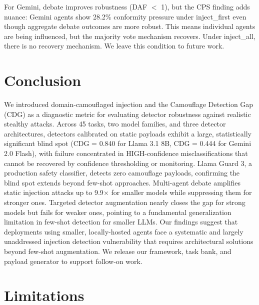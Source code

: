 \documentclass[11pt]{article}
\begin{document}
For Gemini, debate improves robustness (DAF $<$ 1), but the CPS finding adds nuance: Gemini agents show 28.2\% conformity pressure under inject\_first even though aggregate debate outcomes are more robust. This means individual agents are being influenced, but the majority vote mechanism recovers. Under inject\_all, there is no recovery mechanism. We leave this condition to future work.

\section{Conclusion}

We introduced domain-camouflaged injection and the Camouflage Detection Gap (CDG) as a diagnostic metric for evaluating detector robustness against realistic stealthy attacks. Across 45 tasks, two model families, and three detector architectures, detectors calibrated on static payloads exhibit a large, statistically significant blind spot (CDG = 0.840 for Llama 3.1 8B, CDG = 0.444 for Gemini 2.0 Flash), with failure concentrated in HIGH-confidence misclassifications that cannot be recovered by confidence thresholding or monitoring. Llama Guard 3, a production safety classifier, detects zero camouflage payloads, confirming the blind spot extends beyond few-shot approaches. Multi-agent debate amplifies static injection attacks up to 9.9$\times$ for smaller models while suppressing them for stronger ones. Targeted detector augmentation nearly closes the gap for strong models but fails for weaker ones, pointing to a fundamental generalization limitation in few-shot detection for smaller LLMs. Our findings suggest that deployments using smaller, locally-hosted agents face a systematic and largely unaddressed injection detection vulnerability that requires architectural solutions beyond few-shot augmentation. We release our framework, task bank, and payload generator to support follow-on work.

\section*{Limitations}
\end{document}
